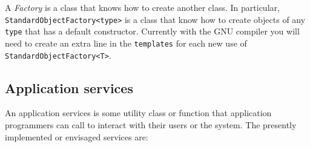 A {\em Factory} is a class that knows how to create another class. In
particular, {\tt StandardObjectFactory<type>} is a class that know how
to create objects of any {\tt type} that has a default
constructor. Currently with the GNU compiler you will need to create
an extra line in the {\tt templates} for each new use of {\tt
StandardObjectFactory<T>}.

\subsection{Application services}
\label{sec:appservices}

An application services is some utility class or function that
application programmers can call to interact with their users or the
system. The presently implemented or envisaged services are:

